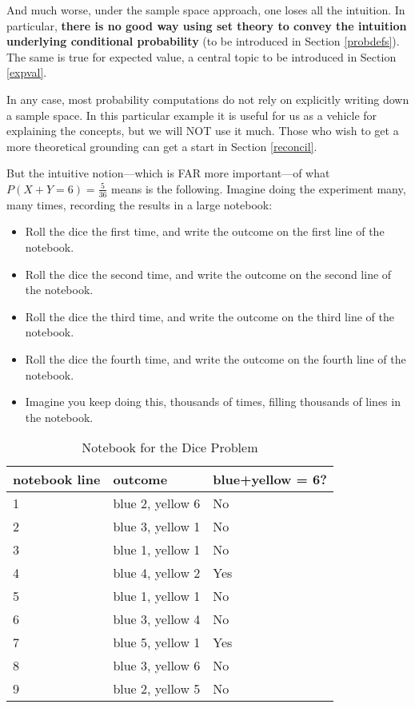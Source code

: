And much worse, under the sample space approach, one loses all the
intuition.  In particular, {\bf there is no good way using set theory to
convey the intuition underlying conditional probability} (to be
introduced in Section \ref{probdefs}).  The same is true for expected
value, a central topic to be introduced in Section \ref{expval}.

In any case, most probability computations do not rely on explicitly
writing down a sample space.  In this particular example it is useful
for us as a vehicle for explaining the concepts, but we will NOT use it
much.  Those who wish to get a more theoretical grounding can get a
start in Section \ref{reconcil}.

But the intuitive notion---which is FAR more important---of what $P(X+Y
= 6) = \frac{5}{36}$ means is the following.  Imagine doing the
experiment many, many times, recording the results in a large notebook:

\begin{itemize}

\item Roll the dice the first time, and write the outcome on the first
line of the notebook.

\item Roll the dice the second time, and write the outcome on the second
line of the notebook.

\item Roll the dice the third time, and write the outcome on the third
line of the notebook.

\item Roll the dice the fourth time, and write the outcome on the fourth
line of the notebook.

\item Imagine you keep doing this, thousands of times, filling
thousands of lines in the notebook.

\end{itemize} 

\begin{table}
\begin{center}
\vskip 0.5in

\begin{tabular}{|l|l|l|}
\hline
notebook line & outcome & blue+yellow = 6?  \\ \hline 
\hline
1 & blue 2, yellow 6 & No \\ \hline 
2 & blue 3, yellow 1 & No \\ \hline 
3 & blue 1, yellow 1 & No \\ \hline 
4 & blue 4, yellow 2 & Yes \\ \hline 
5 & blue 1, yellow 1 & No \\ \hline 
6 & blue 3, yellow 4 & No \\ \hline 
7 & blue 5, yellow 1 & Yes \\ \hline 
8 & blue 3, yellow 6 & No \\ \hline 
9 & blue 2, yellow 5 & No \\ \hline 
\end{tabular}

\end{center}
\caption{Notebook for the Dice Problem}
\label{dicenotebook} 
\end{table}

